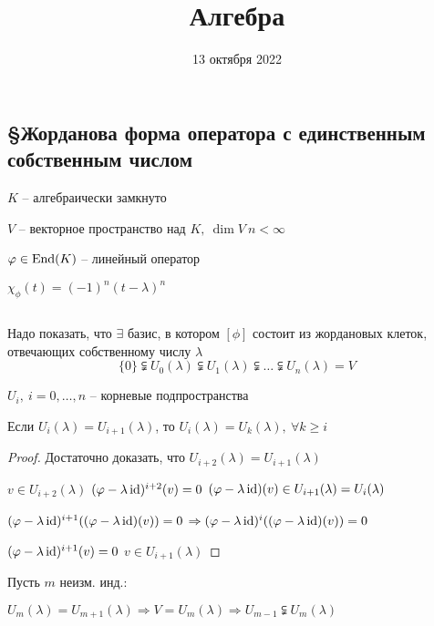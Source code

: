 

\setcounter{lemma}{0}


    \title{Алгебра}
    \date{13 октября 2022}
    \maketitle

    \pagebreak

    \subsection*{\S Жорданова форма оператора с единственным собственным числом}

    \par $K$ -- алгебраически замкнуто
    \par $V$ -- векторное пространство над $K, \ \dim V \ n < \infty$
    \par $\varphi \in \operatorname{End}(K)$ -- линейный оператор
    \par $\chi_\phi(t) = (-1)^n (t - \lambda)^n$
    \par $ $
    \par Надо показать, что $\exists$ базис, в котором $[\phi]$ состоит из жордановых клеток, отвечающих
    собственному числу $\lambda$
    \[
        \{0\} \subsetneqq U_0(\lambda) \subsetneqq U_1(\lambda) \subsetneqq \dots \subsetneqq U_n(\lambda) = V    
    \]
    \par $U_i, \ i = 0, \dots, n$ -- корневые подпространства

    \begin{lemma}
        Если $U_i(\lambda) = U_{i+1}(\lambda)$, то $U_i(\lambda) = U_k(\lambda), \ \forall k \ge i$
    \end{lemma}

    \begin{proof}
        Достаточно доказать, что $U_{i+2}(\lambda) = U_{i+1}(\lambda)$
        \par \quad $v \in U_{i+2}(\lambda)$ \quad $(\varphi - \lambda \operatorname{id})^{i+2}(v) = 0$ \quad $(\varphi - \lambda \operatorname{id})(v) \in U_{i+1}(\lambda) = U_i(\lambda)$
        \par \quad $(\varphi - \lambda \operatorname{id})^{i+1}((\varphi - \lambda \operatorname{id})(v)) = 0$ \quad $\Rightarrow (\varphi - \lambda \operatorname{id})^i((\varphi - \lambda \operatorname{id})(v)) = 0$ 
        \par \quad $(\varphi - \lambda\operatorname{id})^{i+1}(v) = 0$ \quad $v \in U_{i+1}(\lambda)$
    \end{proof}

    \par Пусть $m$ неизм. инд.:
    \par $U_m(\lambda) = U_{m+1}(\lambda) \Rightarrow V = U_m(\lambda) \Rightarrow U_{m-1} \subsetneqq U_m(\lambda)$

